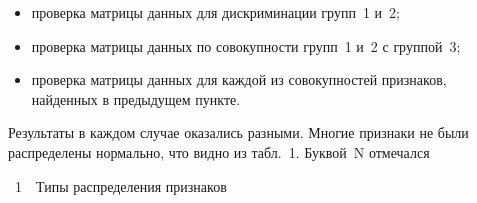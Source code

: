 \begin{multicols}{2}
\begin{itemize}
 \item проверка матрицы данных для дискриминации групп~1 и~2;
 \item проверка матрицы данных по совокупности групп~1 и~2 с группой~3;
 \item проверка матрицы данных для каждой из совокупностей признаков, 
 найденных в предыдущем пункте.
\end{itemize}

Результаты в каждом случае оказались разными. Многие признаки не
были распределены нормально, что видно из табл.~1. Буквой~N 
отмечался\linebreak\vspace*{-12pt}
 
 
\begin{center}
{{\tablename~1}\ \ \small{Типы распределения признаков}}
                \vspace*{2ex}
        

\end{center}
\end{multicols}
